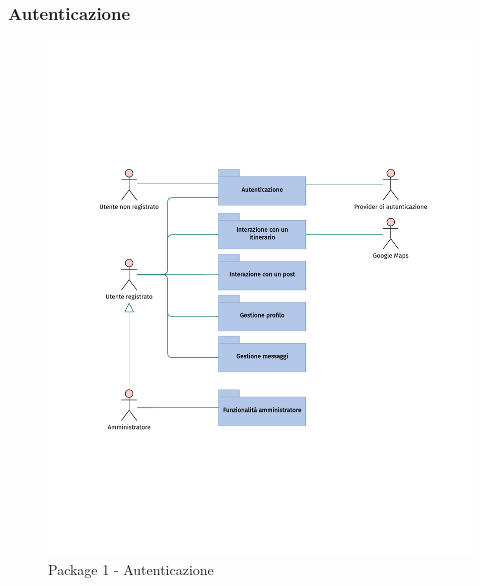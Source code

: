\documentclass{natourDoc}
\begin{document}
\newpage
\subsubsection{Autenticazione}
\begin{figure}[!htbp]
	\centering
	\includegraphics[width=\textwidth, page=2]{./diagrams/useCase.pdf}
	\caption{Package 1 - Autenticazione}
\end{figure}
\FloatBarrier

\newpage
\end{document}
